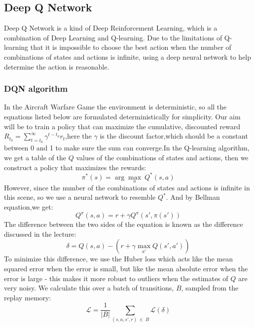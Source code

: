 \documentclass{article}
\begin{document}
    \subsection{Deep Q Network}
    Deep Q Network is a kind of Deep Reinforcement Learning, which is a combination of Deep Learning and Q-learning. Due to the limitations of Q-learning that it is impossible to choose the best action when the number of combinations of states and actions is infinite, using a deep neural network to help determine the action is reasonable. 
    
    \subsubsection{DQN algorithm} In the Aircraft Warfare Game the environment is deterministic, so all the equations listed below are formulated deterministically for simplicity. Our aim will be to train a policy that can maximize the cumulative, discounted reward $R_{t_0} = \sum_{t=t_0}^{\infty} {\gamma}^{t-t_0}r_t$,here the $\gamma$ is the discount factor,which should be a constant between 0 and 1 to make sure the sum can converge.In the Q-learning algorithm, we get a table of the $Q$ values of the combinations of states and actions, then we construct a policy that maximizes the rewards:
    $$\pi^*(s) = \arg\!\max_a \ Q^*(s, a)$$
    However, since the number of the combinations of states and actions is infinite in this scene, so we use a neural network to resemble $Q^*$. And by Bellman equation,we get:
    $$Q^{\pi}(s, a) = r + \gamma Q^{\pi}(s', \pi(s'))$$
    The difference between the two sides of the equation is known as the difference discussed in the lecture:
    $$\delta = Q(s, a) - (r + \gamma \max_{a'} Q(s', a'))$$
    To minimize this difference, we use the Huber loss which acts
    like the mean squared error when the error is small, but like the mean
    absolute error when the error is large - this makes it more robust to
    outliers when the estimates of $Q$ are very noisy. We calculate
    this over a batch of transitions, $B$, sampled from the replay
    memory:
    $$\mathcal{L} = \frac{1}{|B|}\sum_{(s, a, s', r) \ \in \ B} \mathcal{L}(\delta)$$
    
\end{document}
